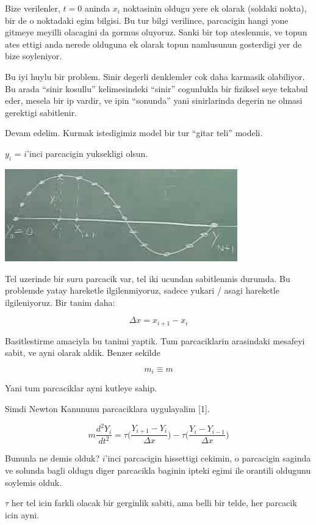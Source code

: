 \documentclass[12pt,fleqn]{article}
\begin{document}
Bize verilenler, $t=0$ aninda $x_i$ noktasinin oldugu yere ek olarak
(soldaki nokta), bir de o noktadaki egim bilgisi. Bu tur bilgi verilince,
parcacigin hangi yone gitmeye meyilli olacagini da gormus oluyoruz. Sanki
bir top ateslenmis, ve topun ates ettigi anda nerede olduguna ek olarak
topun namlusunun gosterdigi yer de bize soyleniyor.

Bu iyi huylu bir problem. Sinir degerli denklemler cok daha karmasik
olabiliyor. Bu arada ``sinir kosullu'' kelimesindeki ``sinir'' cogunlukla
bir fiziksel seye tekabul eder, mesela bir ip vardir, ve ipin ``sonunda''
yani sinirlarinda degerin ne olmasi gerektigi sabitlenir. 

Devam edelim. Kurmak istedigimiz model bir tur ``gitar teli'' modeli. 

$y_i$ = $i$'inci parcacigin yuksekligi olsun. 

\includegraphics[height=4cm]{1_07.png}

Tel uzerinde bir suru parcacik var, tel iki ucundan sabitlenmis durumda. Bu
problemde yatay hareketle ilgilenmiyoruz, sadece yukari / asagi hareketle
ilgileniyoruz. Bir tanim daha:

\[ \Delta x = x_{i+1} - x_i  \]

Basitlestirme amaciyla bu tanimi yaptik. Tum parcaciklarin arasindaki
mesafeyi sabit, ve ayni olarak aldik. Benzer sekilde

\[ m_i \equiv m \]

Yani tum parcaciklar ayni kutleye sahip. 

Simdi Newton Kanununu parcaciklara uygulayalim [1]. 

\[ m \frac{d^2Y_i}{dt^2} = 
\tau \bigg( \frac{Y_{i+1}- Y_i}{\Delta x} \bigg) -
\tau \bigg( \frac{Y_{i}- Y_{i-1}}{\Delta x} \bigg) 
\]

Bununla ne demis olduk? $i$'inci parcacigin hissettigi cekimin, o
parcacigin saginda ve solunda bagli oldugu diger parcacikla baginin ipteki
egimi ile orantili oldugunu soylemis olduk.

$\tau$ her tel icin farkli olacak bir gerginlik sabiti, ama belli bir
telde, her parcacik icin ayni. 
\end{document}
